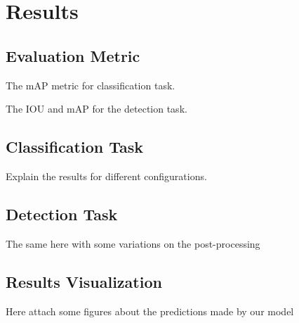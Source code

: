 \chapter{Results}
\label{section:results}

\section{Evaluation Metric}

The mAP metric for classification task.

The IOU and mAP for the detection task.

\section{Classification Task}

Explain the results for different configurations.

\section{Detection Task}

The same here with some variations on the post-processing

\section{Results Visualization}

Here attach some figures about the predictions made by our model
